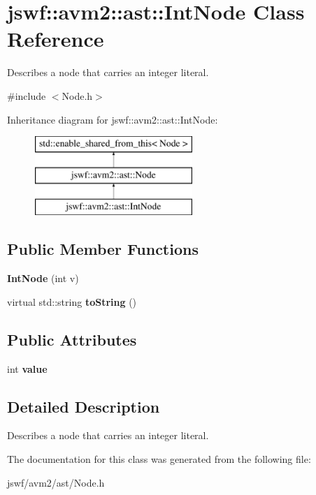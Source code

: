 \hypertarget{classjswf_1_1avm2_1_1ast_1_1_int_node}{\section{jswf\+:\+:avm2\+:\+:ast\+:\+:Int\+Node Class Reference}
\label{classjswf_1_1avm2_1_1ast_1_1_int_node}
}


Describes a node that carries an integer literal.  




{\ttfamily \#include $<$Node.\+h$>$}

Inheritance diagram for jswf\+:\+:avm2\+:\+:ast\+:\+:Int\+Node\+:\begin{figure}[H]
\begin{center}
\leavevmode
\includegraphics[height=3.000000cm]{classjswf_1_1avm2_1_1ast_1_1_int_node}
\end{center}
\end{figure}
\subsection*{Public Member Functions}
\begin{DoxyCompactItemize}
\item 
\hypertarget{classjswf_1_1avm2_1_1ast_1_1_int_node_aea17b59404788a611adc76798c4c7e33}{{\bfseries Int\+Node} (int v)}\label{classjswf_1_1avm2_1_1ast_1_1_int_node_aea17b59404788a611adc76798c4c7e33}

\item 
\hypertarget{classjswf_1_1avm2_1_1ast_1_1_int_node_a09eae9556ab956d91b4035585d34b743}{virtual std\+::string {\bfseries to\+String} ()}\label{classjswf_1_1avm2_1_1ast_1_1_int_node_a09eae9556ab956d91b4035585d34b743}

\end{DoxyCompactItemize}
\subsection*{Public Attributes}
\begin{DoxyCompactItemize}
\item 
\hypertarget{classjswf_1_1avm2_1_1ast_1_1_int_node_a04c26ec9971a10a08477e24ff21b04ed}{int {\bfseries value}}\label{classjswf_1_1avm2_1_1ast_1_1_int_node_a04c26ec9971a10a08477e24ff21b04ed}

\end{DoxyCompactItemize}


\subsection{Detailed Description}
Describes a node that carries an integer literal. 

The documentation for this class was generated from the following file\+:\begin{DoxyCompactItemize}
\item 
jswf/avm2/ast/Node.\+h\end{DoxyCompactItemize}

